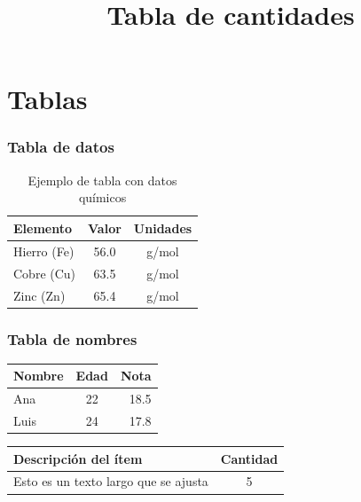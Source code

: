 \documentclass{beamer}
\begin{document}
\section{Tablas}

\begin{frame}
  \frametitle{Tabla de datos}
  \begin{table}
    \centering
    \begin{tabular}{lcc}
      \toprule
      Elemento & Valor & Unidades \\
      \midrule
      Hierro (Fe) & 56.0 & g/mol \\
      Cobre (Cu) & 63.5 & g/mol \\
      Zinc (Zn) & 65.4 & g/mol \\
      \bottomrule
    \end{tabular}
    \caption{Ejemplo de tabla con datos químicos}
  \end{table}
\end{frame}

\begin{frame}
    \frametitle{Tabla de nombres}
    \begin{flushright}
        
        \begin{tabular}{|l|c|r|}
            \hline
            Nombre & Edad & Nota \\
            \hline
            Ana    & 22   & 18.5 \\
            Luis   & 24   & 17.8 \\
            \hline
        \end{tabular}
    \end{flushright}
\end{frame}

\begin{frame}
    \title{Tabla de cantidades}
    \begin{flushleft}
        
        \begin{tabular}{|p{4cm}|c|}
            \hline
            Descripción del ítem & Cantidad \\
            \hline
            Esto es un texto largo que se ajusta & 5 \\
            \hline
        \end{tabular}
    \end{flushleft}
\end{frame}
\end{document}
